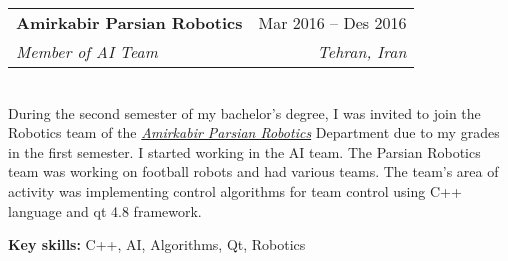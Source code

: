 \documentclass[a4paper,11pt]{article}
\makeatletter
\newcommand{\resumeItem}[1]{
\item{\small{#1}}
}
\newcommand{\resumeItemListStart}{\begin{itemize}[rightmargin=0.11in]}
\newcommand{\resumeQuadHeading}[4]{
\item
\begin{tabular*}{0.96\textwidth}[t]{l@{\extracolsep{\fill}}r}
\textbf{#1} & #2 \\
\textit{\small#3} & \textit{\small #4} \\
\end{tabular*}
}
\makeatother
\begin{document}
\resumeQuadHeading{Amirkabir Parsian Robotics}{Mar 2016 -- Des 2016}
{Member of AI Team}{Tehran, Iran}\\
During the second semester of my bachelor's degree, I was invited to join the Robotics team of the \href{http://www.parsianrobotics.aut.ac.ir/}{\textit{Amirkabir Parsian Robotics}} Department due to my grades in the first semester.
I started working in the AI team. The Parsian Robotics team was working on football robots and had various teams. The team's area of activity was implementing control algorithms for team control using C++ language and qt 4.8 framework.

\textbf{Key skills:} C++, AI, Algorithms, Qt, Robotics



\end{document}
